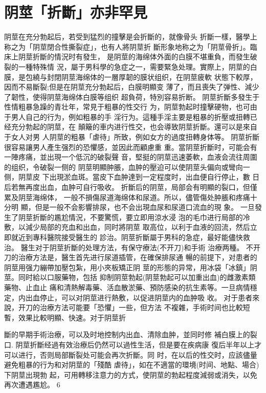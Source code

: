 \documentclass[12pt,UTF8]{ctexbook}
\begin{document}
\section{阴莖「折斷」亦非罕見}
阴莖在充分勃起后，若受到猛烈的撞擊是会折斷的，就像骨头
折斷一樣，醫學上称之为「阴莖閉合性撕裂症」，也有人將阴莖折
斷形象地称之为「阴莖骨折」。臨床上阴莖折斷的情況时有發生，
是阴莖的海绵体外面的白膜不堪重負，而發生破裂的一種特殊情
況，屬于男科學的急症之一，需要緊急处理。實際上，阴莖的白
膜，是包繞与封閉阴莖海绵体的一層厚韌的膜状组织，在阴莖疲軟
状態下較厚，因而不易斷裂;但是在阴莖充分勃起后，白膜明顯变
薄了，而且喪失了弹性、減少了韌性，使得阴莖海绵体白膜等组织
超負荷，特別容易折断。
阴莖折斷多發生于性情粗暴急躁的青壮年，常見于粗暴的性交行
为，阴莖勃起时撞擊硬物，也可由于男人自己的行为，例如粗暴的手
淫行为。這種手淫主要是粗暴的折壓或扭轉已经充分勃起的阴莖，在
顛簸的車内进行性交，也会導致阴莖折斷。還可以是來自于女人对男
人阴莖的粗暴「虐待」所致，例如女方的過度扭轉身体等。
阴莖折斷很容易讓男人產生强烈的恐懼感，並因此而顧慮重
重。當阴莖折斷时，可能会有一陣疼痛，並出現一个低沉的破裂聲
音，堅挺的阴莖迅速萎軟，血液会流往周圍的组织，令破裂一侧的
阴莖明顯肿脹，血肿的壓迫可以使阴莖头偏向或彎向一侧，阴莖皮
下出現淤血斑。當皮下血肿達到一定程度时，出血便自行停止，數
日后若無再度出血，血肿可自行吸收。
折斷后的阴莖，局部会有明顯的裂口，但僅累及阴莖海绵体，
一般不損傷尿道海绵体和尿道。所以，儘管傷处肿脹和疼痛十分明
顯，但是一般不会影響排尿，也不会出現血尿和尿道口流血的現
象。
一旦發生了阴莖折斷的尷尬情況，不要驚慌，要立即用涼水浸
泡的毛巾进行局部的冷敷，以減少局部的充血和出血，同时將阴莖
取高位，以利于血液的回流，然后立即就近到專科醫院接受醫生的
診治。阴莖折斷屬于男科的急症，最好能儘快救治。
醫生对于阴莖折斷的处理方法，有保守療法(不开刀)和手術
治療两種。
不开刀的治療方法是，醫生首先进行尿道插管，在確保排尿通
暢的前提下，对患者的阴莖用强力繃帶加壓包紮，用小夾板矯正阴
莖的形態的异常，用冰袋「冰鎮」阴莖。同时給以口服藥物，包括
抑制阴莖勃起(阴莖勃起可以加重出血)的雌激素類藥物、止血止
痛和清熱解毒藥、活血散淤藥、預防感染的抗生素等。一旦病情穩
定，内出血停止，可以对阴莖进行熱敷，以促进阴莖内的血肿吸
收。
对于患者來說，开刀的治療方法可能要「恐懼」一些，但方法
不複雜，手術时间也比較短暫，效果比較明顯、快速。对于阴莖折

斷的早期手術治療，可以及时地控制内出血、清除血肿，並同时修
補白膜上的裂口.
阴莖折斷经過有效治療后仍然可以過性生活，但是要在疾病康
復后半年以上才可以进行，否则局部斷裂处可能会再次折斷。同
时，在以后的性交时，应該儘量避免粗暴的行为和对阴莖的「殘酷
虐待」，如在不適當的環境(时间、地點、場合)下阴莖出現勃
起，可用轉移注意力的方式，使阴莖的勃起程度減弱或消失，以免
再次遭遇尷尬。
6
\end{document}
